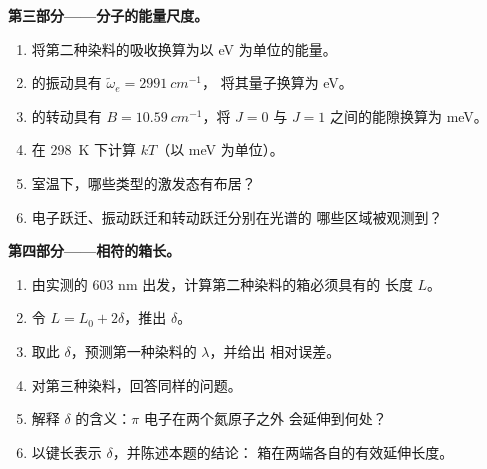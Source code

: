\begin{problem}
\medskip\noindent\textbf{第三部分——分子的能量尺度。}
\begin{enumerate}[resume]
  \item 将第二种染料的吸收换算为以 eV 为单位的能量。
  \item {} 的振动具有 $\tilde\omega_e = \qty{2991}{cm^{-1}}$，
        将其量子换算为 eV。
  \item {} 的转动具有 $B = \qty{10.59}{cm^{-1}}$，将
        $J = 0$ 与 $J = 1$ 之间的能隙换算为 meV。
  \item 在 \qty{298}{K} 下计算 $kT$（以 meV 为单位）。
  \item 室温下，哪些类型的激发态有布居？
  \item 电子跃迁、振动跃迁和转动跃迁分别在光谱的
        哪些区域被观测到？
\end{enumerate}

\medskip\noindent\textbf{第四部分——相符的箱长。}
\begin{enumerate}[resume]
  \item 由实测的 603 nm 出发，计算第二种染料的箱必须具有的
        长度 $L$。
  \item 令 $L = L_0 + 2\delta$，推出 $\delta$。
  \item 取此 $\delta$，预测第一种染料的 $\lambda$，并给出
        相对误差。
  \item 对第三种染料，回答同样的问题。
  \item 解释 $\delta$ 的含义：$\pi$ 电子在两个氮原子之外
        会延伸到何处？
  \item 以键长表示 $\delta$，并陈述本题的结论：
        箱在两端各自的有效延伸长度。
\end{enumerate}
\end{problem}
